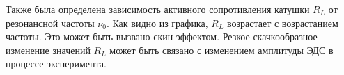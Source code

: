 \documentclass[a4paper, 12pt]{article}
\begin{document}
Также была определена зависимость активного сопротивления катушки $R_L$ от резонансной частоты $\nu_0$. Как видно из графика, $R_L$ возрастает с возрастанием частоты. Это может быть вызвано скин-эффектом. Резкое скачкообразное изменение значений $R_L$ может быть связано с изменением амплитуды ЭДС в процессе эксперимента.
\end{document}
